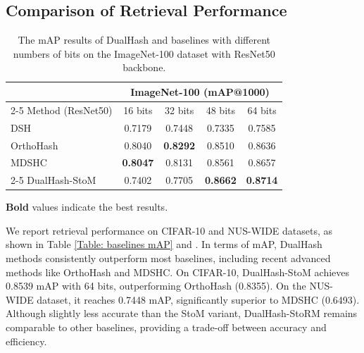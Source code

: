 \subsection{Comparison of Retrieval Performance}
\label{Subsection: Comparison of retrieval performance}
\begin{table}[t]
    \centering
    \caption{The mAP results of DualHash and baselines with different numbers of bits on the ImageNet-100 dataset with ResNet50 backbone.}
    \label{tab:performance_imagenet_resnet50}
    \small
    \begin{tabular}{lcccc}
     \toprule
 & \multicolumn{4}{c}{ImageNet-100 (mAP@1000)} \\
\cmidrule(lr){2-5}
Method (ResNet50) & 16 bits & 32 bits & 48 bits & 64 bits \\
\midrule
DSH \cite{liuDeepSupervisedHashing} & 0.7179 & 0.7448 & 0.7335 & 0.7585 \\
OrthoHash \cite{hoeOneLossAll2021} & 0.8040 & \textbf{0.8292} & 0.8510 & 0.8636 \\
MDSHC \cite{wang2023deep} & \textbf{0.8047} & 0.8131 & 0.8561 & 0.8657 \\
 \cmidrule(lr){2-5}
DualHash-StoM & 0.7402 & 0.7705 & \textbf{0.8662} & \textbf{0.8714} \\
        \bottomrule
    \end{tabular}
    \vspace{2ex}
    \parbox{\linewidth}{\footnotesize
    \textbf{Bold} values indicate the best results.
    }
    \vspace{-2ex}
\end{table}
We report retrieval performance on CIFAR-10 and NUS-WIDE datasets, as shown in Table \ref{Table: baselines mAP}
and . 
In terms of mAP, DualHash methods consistently outperform most baselines, including recent advanced methods like OrthoHash and MDSHC.
On CIFAR-10, DualHash-StoM achieves 0.8539 mAP with 64 bits, outperforming OrthoHash (0.8355). On the NUS-WIDE dataset, it reaches 0.7448 mAP, significantly superior to MDSHC (0.6493).  
Although slightly less accurate than the StoM variant, DualHash-StoRM remains comparable to other baselines, providing a trade-off between accuracy and efficiency. 

